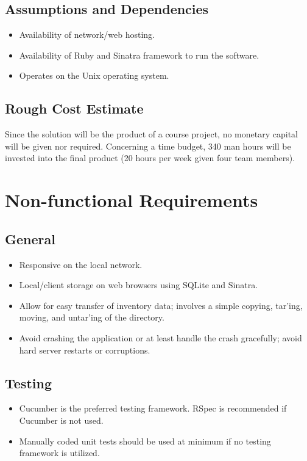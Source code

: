 \documentclass{article}
\begin{document}
\subsection{Assumptions and Dependencies}
\begin{itemize}
\item Availability of network/web hosting.
\item Availability of Ruby and Sinatra framework to run the software.
\item Operates on the Unix operating system.
\end{itemize}

\subsection{Rough Cost Estimate}
Since the solution will be the product of a course project, no monetary capital will be given nor required.  Concerning a time budget, 340 man hours will be invested into the final product (20 hours per week given four team members).

\section{Non-functional Requirements}

\subsection{General}
\begin{itemize}
\item Responsive on the local network.
\item Local/client storage on web browsers using SQLite and Sinatra.
\item Allow for easy transfer of inventory data; involves a simple copying, tar'ing, moving, and untar'ing of the directory.
\item Avoid crashing the application or at least handle the crash gracefully; avoid hard server restarts or corruptions.
\end{itemize}

\subsection{Testing}
\begin{itemize}
\item Cucumber is the preferred testing framework. RSpec is recommended if Cucumber is not used.
\item Manually coded unit tests should be used at minimum if no testing framework is utilized.
\end{itemize}
\end{document}
